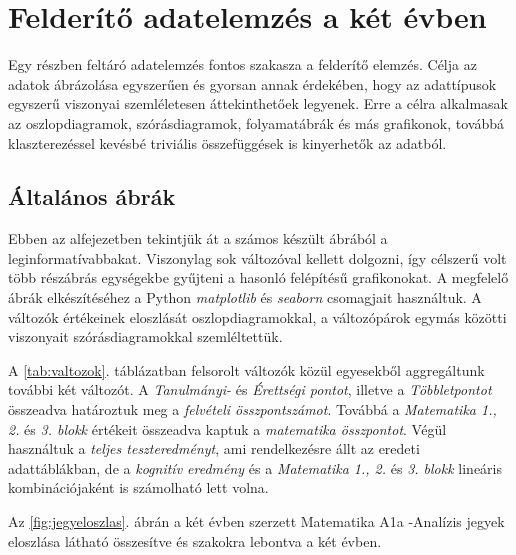 \documentclass[12pt]{article}
\begin{document}
\newpage

\section{Felderítő adatelemzés a két évben}

Egy részben feltáró adatelemzés fontos szakasza a felderítő elemzés. Célja az adatok ábrázolása egyszerűen és gyorsan annak érdekében, hogy az adattípusok egyszerű viszonyai szemléletesen áttekinthetőek legyenek. Erre a célra alkalmasak az oszlopdiagramok, szórásdiagramok, folyamatábrák és más grafikonok, továbbá klaszterezéssel kevésbé triviális összefüggések is kinyerhetők az adatból.

\subsection{Általános ábrák}
\label{ssec:altalanos}

Ebben az alfejezetben tekintjük át a számos készült ábrából a leginformatívabbakat. Viszonylag sok változóval kellett dolgozni, így célszerű volt több részábrás egységekbe gyűjteni a hasonló felépítésű grafikonokat. A megfelelő ábrák elkészítéséhez a Python \emph{matplotlib} és \emph{seaborn} csomagjait használtuk. A változók értékeinek eloszlását oszlopdiagramokkal, a változópárok egymás közötti viszonyait szórásdiagramokkal szemléltettük.

A \ref{tab:valtozok}. táblázatban felsorolt változók közül egyesekből aggregáltunk további két változót. A \emph{Tanulmányi-} és \emph{Érettségi pontot}, illetve a \emph{Többletpontot} összeadva határoztuk meg a \emph{felvételi összpontszámot}. Továbbá a \emph{Matematika 1., 2.} és \emph{3. blokk} értékeit összeadva kaptuk a \emph{matematika összpontot}. Végül használtuk a \emph{teljes teszteredményt}, ami rendelkezésre állt az eredeti adattáblákban, de a \emph{kognitív eredmény} és a \emph{Matematika 1., 2.} és \emph{3. blokk} lineáris kombinációjaként is számolható lett volna.



Az \ref{fig:jegyeloszlas}. ábrán a két évben szerzett Matematika A1a -Analízis jegyek eloszlása látható összesítve és szakokra lebontva a két évben. 
\end{document}
